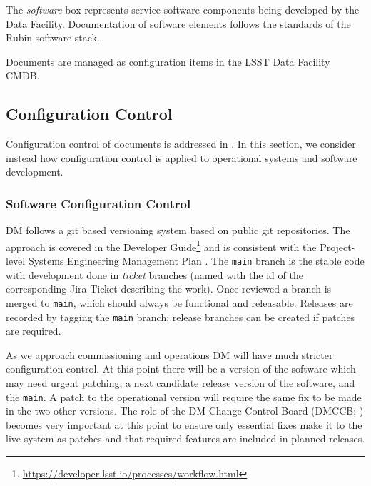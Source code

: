 The \textit{software} box represents service software components being developed by the Data Facility.
Documentation of software elements follows the standards of the Rubin software \gls{stack}.

Documents are managed as \gls{configuration} items in the LSST Data Facility \gls{CMDB}.

\subsection {Configuration Control} \label{sect:config}

Configuration control of documents is addressed in . In this section, we consider instead how \gls{configuration} control is applied to operational systems and software development.

\subsubsection{Software Configuration Control}

DM  follows a \gls{git} based versioning system based on public \gls{git} repositories.  The approach is covered in the Developer Guide\footnote{\url{https://developer.lsst.io/processes/workflow.html}} and is consistent with the Project-level \gls{Systems Engineering} Management Plan .
The \texttt{main} branch is the stable code with development done in \emph{ticket} branches (named with the id of the corresponding Jira Ticket describing the work).
Once reviewed a branch is merged to \texttt{main}, which should always be functional and releasable.
Releases are recorded by tagging the \texttt{main} branch; release branches can be created if patches are required.

As we approach commissioning and operations DM will have much stricter \gls{configuration} control.
At this point there will be a version of the software which may need urgent patching, a next candidate release version of the software, and the \texttt{main}.
A \gls{patch} to the operational version will require the same fix to be made in the two other versions.
The role of the DM  \gls{Change Control Board} (\gls{DMCCB}; ) becomes very important at this point to ensure only essential fixes make it to the live system as patches and that required features are included in planned releases.

